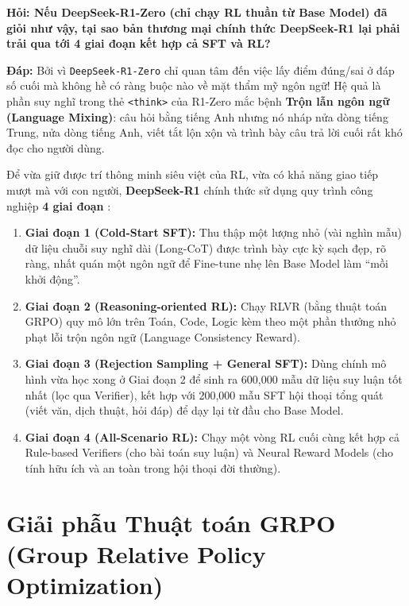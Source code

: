 \begin{debate}
\textbf{Hỏi: Nếu DeepSeek-R1-Zero (chỉ chạy RL thuần từ Base Model) đã giỏi như vậy, tại sao bản thương mại chính thức DeepSeek-R1 lại phải trải qua tới 4 giai đoạn kết hợp cả SFT và RL?}

\textbf{Đáp:} Bởi vì \texttt{DeepSeek-R1-Zero} chỉ quan tâm đến việc lấy điểm đúng/sai ở đáp số cuối mà không hề có ràng buộc nào về mặt thẩm mỹ ngôn ngữ! Hệ quả là phần suy nghĩ trong thẻ \texttt{<think>} của R1-Zero mắc bệnh \textbf{Trộn lẫn ngôn ngữ (Language Mixing)}: câu hỏi bằng tiếng Anh nhưng nó nháp nửa dòng tiếng Trung, nửa dòng tiếng Anh, viết tắt lộn xộn và trình bày câu trả lời cuối rất khó đọc cho người dùng.

Để vừa giữ được trí thông minh siêu việt của RL, vừa có khả năng giao tiếp mượt mà với con người, \textbf{DeepSeek-R1} chính thức sử dụng quy trình công nghiệp \textbf{4 giai đoạn} \citep{deepseek2025r1}:
\begin{enumerate}
  \item \textbf{Giai đoạn 1 (Cold-Start SFT):} Thu thập một lượng nhỏ (vài nghìn mẫu) dữ liệu chuỗi suy nghĩ dài (Long-CoT) được trình bày cực kỳ sạch đẹp, rõ ràng, nhất quán một ngôn ngữ để Fine-tune nhẹ lên Base Model làm ``mồi khởi động''.
  \item \textbf{Giai đoạn 2 (Reasoning-oriented RL):} Chạy RLVR (bằng thuật toán GRPO) quy mô lớn trên Toán, Code, Logic kèm theo một phần thưởng nhỏ phạt lỗi trộn ngôn ngữ (Language Consistency Reward).
  \item \textbf{Giai đoạn 3 (Rejection Sampling + General SFT):} Dùng chính mô hình vừa học xong ở Giai đoạn 2 để sinh ra 600,000 mẫu dữ liệu suy luận tốt nhất (lọc qua Verifier), kết hợp với 200,000 mẫu SFT hội thoại tổng quát (viết văn, dịch thuật, hỏi đáp) để dạy lại từ đầu cho Base Model.
  \item \textbf{Giai đoạn 4 (All-Scenario RL):} Chạy một vòng RL cuối cùng kết hợp cả Rule-based Verifiers (cho bài toán suy luận) và Neural Reward Models (cho tính hữu ích và an toàn trong hội thoại đời thường).
\end{enumerate}
\end{debate}

\section{Giải phẫu Thuật toán GRPO (Group Relative Policy Optimization)}
\label{sec:grpo_math}

